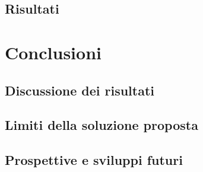 \documentclass[12pt]{report}
\begin{document}
\section{Risultati}
\label{risultati}

\chapter{Conclusioni}
\label{chap:conclusioni}

\section{Discussione dei risultati}
\label{chap:discussione_risultati}

\section{Limiti della soluzione proposta}
\label{chap:limiti}

\section{Prospettive e sviluppi futuri}
\label{chap:prospettive}

\beforebibliography



\closingpage
\end{document}
